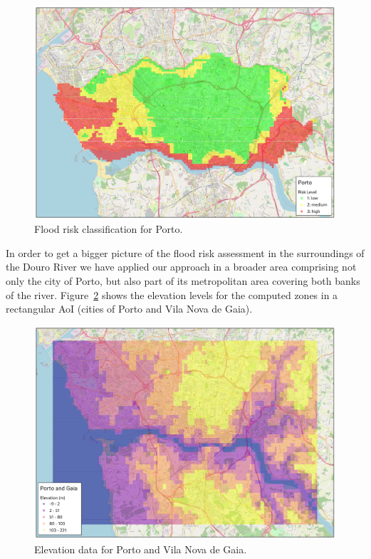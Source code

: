 \begin{refsection}
\begin{figure}[h!]
  \centering
  \includegraphics[width=0.9\linewidth]{Chapters/6-Flood/figs/porto.pdf}
  \caption{Flood risk classification for Porto.}\label{fig:porto}
\end{figure}

In order to get a bigger picture of the flood risk assessment in the surroundings of the Douro River we have applied our approach in a broader area comprising not only the city of Porto, but also part of its metropolitan area covering both banks of the river. Figure~\ref{fig:porto_gaia_elevation} shows the elevation levels for the computed zones in a rectangular AoI (cities of Porto and Vila Nova de Gaia).

\begin{figure}[ht]
  \centering
  \includegraphics[width=0.9\linewidth]{Chapters/6-Flood/figs/porto_gaia_elevation.pdf}
  \caption{Elevation data for Porto and Vila Nova de Gaia.}\label{fig:porto_gaia_elevation}
\end{figure}


\end{refsection}
